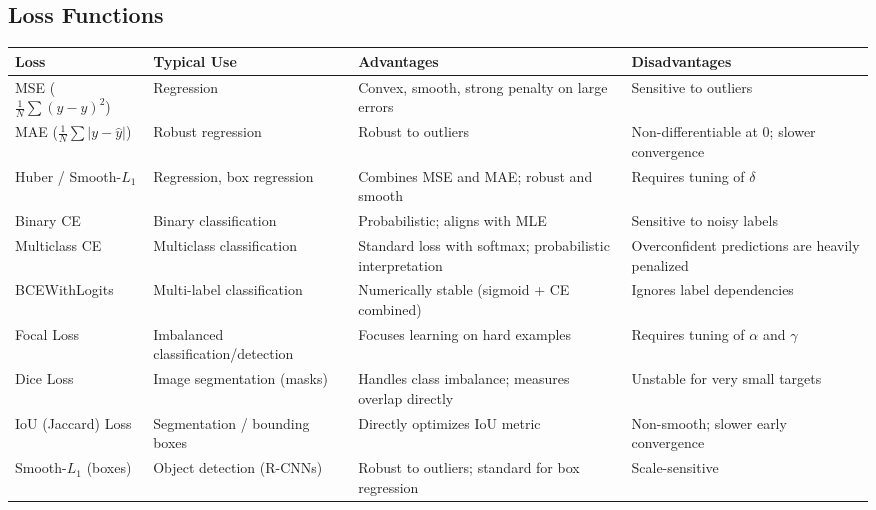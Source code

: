 \documentclass[11pt]{article}
\begin{document}
\subsection*{Loss Functions}
\renewcommand{\arraystretch}{1.25} %
\begin{tabular}{|p{2.8cm}|p{2.8cm}|p{5cm}|p{5cm}|}
\hline
\textbf{Loss} & \textbf{Typical Use} & \textbf{Advantages} & \textbf{Disadvantages} \\ \hline

MSE ($\frac{1}{N}\sum (y-\hat y)^2$) & Regression &
Convex, smooth, strong penalty on large errors &
Sensitive to outliers \\ \hline

MAE ($\frac{1}{N}\sum |y-\hat y|$) & Robust regression &
Robust to outliers &
Non-differentiable at 0; slower convergence \\ \hline

Huber / Smooth-$L_1$ & Regression, box regression &
Combines MSE and MAE; robust and smooth &
Requires tuning of $\delta$ \\ \hline

Binary CE & Binary classification &
Probabilistic; aligns with MLE &
Sensitive to noisy labels \\ \hline

Multiclass CE & Multiclass classification &
Standard loss with softmax; probabilistic interpretation &
Overconfident predictions are heavily penalized \\ \hline

BCEWithLogits & Multi-label classification &
Numerically stable (sigmoid + CE combined) &
Ignores label dependencies \\ \hline

Focal Loss & Imbalanced classification/detection &
Focuses learning on hard examples &
Requires tuning of $\alpha$ and $\gamma$ \\ \hline

Dice Loss & Image segmentation (masks) &
Handles class imbalance; measures overlap directly &
Unstable for very small targets \\ \hline

IoU (Jaccard) Loss & Segmentation / bounding boxes &
Directly optimizes IoU metric &
Non-smooth; slower early convergence \\ \hline

Smooth-$L_1$ (boxes) & Object detection (R-CNNs) &
Robust to outliers; standard for box regression &
Scale-sensitive \\ \hline


\end{tabular}
\end{document}
